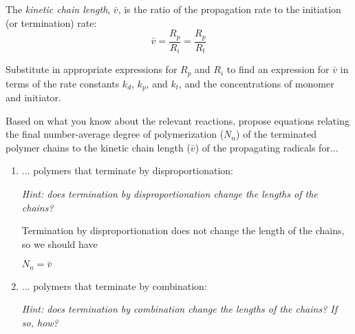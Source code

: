 \begin{activity}
\begin{ctqs}
\end{ctqs}

\begin{infobox}\label{\labelbase:infobox:kineticchainlength}
	The \emph{kinetic chain length}, $\bar v$, is the ratio of the propagation rate to the initiation (or termination) rate:
	\begin{equation*}
		\bar v = \frac{R_p}{R_i} = \frac{R_p}{R_t}
	\end{equation*}
\end{infobox}

\begin{ctqs}

	\question Substitute in appropriate expressions for $R_p$ and $R_i$ to find an expression for $\bar v$ in terms of the rate constants $k_d$, $k_p$, and $k_t$, and the concentrations of monomer and initiator.
	
		\begin{solution}[2.5in]\end{solution}
		
	\question Based on what you know about the relevant reactions, propose equations relating the final number-average degree of polymerization ($N_n$) of the terminated polymer chains to the kinetic chain length ($\bar v$) of the propagating radicals for...
		
		\begin{enumerate}
		
			\item ... polymers that terminate by disproportionation:
			
				\emph{Hint: does termination by disproportionation change the lengths of the chains?}
				
				\begin{solution}[0.75in]
					Termination by disproportionation does not change the length of the chains, so we should have 
					
					$N_n = \bar v$
				\end{solution}
			
			\item ... polymers that terminate by combination:
			
				\emph{Hint: does termination by combination change the lengths of the chains?  If so, how?}
				

\end{enumerate}
\end{ctqs}
\end{activity}
